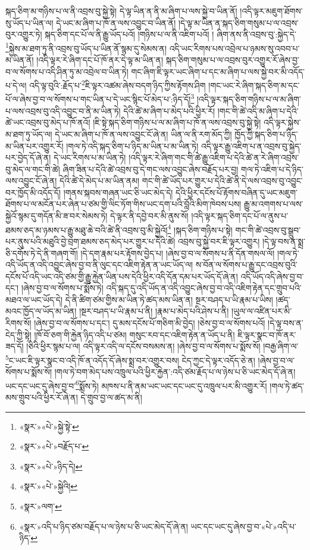 སྐད་ཅིག་མ་གཉིས་པ་ལ་ནི་འབྲས་བུ་སྐྱེ་སྟེ། དེ་ལྟ་ཡིན་ན་ནི་མ་ཞིག་པ་ལས་སྐྱེ་བ་ཡིན་ནོ། །འདི་ལྟར་མཇུག་ཐོགས་སུ་ཡོད་པ་ཡིན་ལ། དེ་ཡང་མ་ཞིག་པ་ཁོ་ན་ལས་འབྱུང་བ་ཡིན་ནོ། །དེ་ལྟ་མ་ཡིན་ན་སྐད་ཅིག་གསུམ་པ་ལ་འབྲས་བུར་འགྱུར་ཏེ། སྐད་ཅིག་དང་པོ་ལ་ནི་རྒྱུ་ཡོད་པའོ། །གཉིས་པ་ལ་ནི་འཇིག་པའོ། །
ཞིག་ནས་ནི་འབྲས་བུ་:སྐྱེད་དེ་\footnote{«སྣར་»«པེ་»སྐྱེ་སྟེ་}སྐྱེས་མ་ཐག་ཏུ་ནི་འབྲས་བུ་ཡོད་པ་ཡིན་ནོ་སྙམ་དུ་སེམས་ན། འདི་ཡང་རིགས་པས་འབྲེལ་པ་ཉམས་སུ་འབབ་པ་མ་ཡིན་ནོ། །འདི་ལྟར་རེ་ཞིག་དང་པོ་ཁོ་ནར་དེ་ལྟ་མ་ཡིན་ན། སྐད་ཅིག་གསུམ་པ་ལ་འབྲས་བུར་འགྱུར་རོ་ཞེས་བྱ་བ་ལ་སོགས་པ་འདི་ཤིན་ཏུ་མ་འབྲེལ་བ་ཡིན་ཏེ། གང་ཞིག་ཇི་ལྟར་ཡང་ཞིག་པ་དང་མ་ཞིག་པ་ལས་སྐྱེ་བར་མི་འདོད་པ་དེ་ལ། འདི་ལྟ་བུའི་:རྗོད་པ་\footnote{«སྣར་»«པེ་»བརྗོད་པ་}ཇི་ལྟར་འཚམ་ཞེས་བདག་ཉིད་ཀྱིས་རྟོགས་ཤིག །གང་ཡང་རེ་ཞིག་སྐད་ཅིག་མ་དང་པོ་ལ་ཞེས་བྱ་བ་ལ་སོགས་པ་གང་ཡིན་པ་དེ་ཡང་སྙིང་པོ་མེད་པ་:ཉིད་དོ།\footnote{«སྣར་»«པེ་»ཉིད་དེ།} །འདི་ལྟར་སྐད་ཅིག་གཉིས་པ་ལ་མ་ཞིག་པ་ལས་འབྲས་བུ་འདི་འབྱུང་བ་ནི་མ་ཡིན་ཏེ། དེའི་ཚེ་མ་ཞིག་པ་མེད་པའི་ཕྱིར་རོ། །གང་གི་ཚེ་འདི་མ་ཞིག་པ་དེའི་ཚེ་ཡང་འབྲས་བུ་མེད་པ་ཁོ་ནའོ། །ཇི་སྟེ་སྐད་ཅིག་གཉིས་པ་ལ་མ་ཞིག་པ་ཁོ་ན་ལས་འབྲས་བུ་སྐྱེ་སྟེ། འདི་ལྟར་སྐྱེས་མ་ཐག་ཏུ་ཡོད་ལ། དེ་ཡང་མ་ཞིག་པ་ཁོ་ན་ལས་འབྱུང་ངོ་ཞེ་ན། ཡིན་ལ་ནི་རག་མོད་ཀྱི། ཁྱོད་ཀྱི་སྐད་ཅིག་པ་ཉིད་མ་ཡིན་པར་འགྱུར་རོ། །གལ་ཏེ་འདི་སྐད་ཅིག་པ་ཉིད་མ་ཡིན་པ་མ་ཡིན་ཏེ། འདི་ལྟར་རྒྱུ་འཇིག་པ་ན་འབྲས་བུ་སྐྱེད་པར་བྱེད་དོ་ཞེ་ན། དེ་ཡང་རིགས་པ་མ་ཡིན་ཏེ། །འདི་ལྟར་རེ་ཞིག་གང་གི་ཚེ་རྒྱུ་འཇིག་པ་དེའི་ཚེ་ན་རེ་ཞིག་འབྲས་བུ་མེད་ལ་གང་གི་ཚེ། ཞིག་ཟིན་པ་དེའི་ཚེ་འབྲས་བུ་དེ་གང་ལས་འབྱུང་ཞེས་བརྗོད་པར་བྱ། གལ་ཏེ་འཇིག་པ་དེ་ཉིད་ལས་འབྱུང་ངོ་ཞེ་ན། དེའི་ཚེ་དེ་མེད་པ་མ་ཡིན་ནམ། གང་གི་ཚེ་ཡོད་པར་གྱུར་པ་དེའི་ཚེ་ནི་དེ་ལས་འབྲས་བུ་འབྱུང་བར་ཁྱོད་མི་འདོད་དོ། །གནས་སྐབས་གཞན་ཡང་ཅི་ཡང་མེད་དེ། དེའི་ཕྱིར་དངོས་པོ་རྟོགས་བཞིན་དུ་ཡང་མཇུག་ཐོགས་པ་ལ་མངོན་པར་ཞེན་པ་ཙམ་གྱི་ལིང་ཏོག་གིས་ཡང་དག་པའི་བློའི་མིག་ཁེབས་པས། རྒྱུ་མ་འགགས་པ་ལས་སྐྱེའོ་སྙམ་དུ་གདོན་མི་ཟ་བར་སེམས་ཏེ། དེ་ལྟར་ནི་དབྱེ་བར་མི་ནུས་སོ། །འདི་ལྟར་སྐད་ཅིག་དང་པོ་ལ་ནུས་པ་ཐམས་ཅད་མ་ཉམས་པ་རྒྱུ་མཐུ་ཆེ་བའི་ཚེ་ནི་འབྲས་བུ་མི་སྐྱེའོ།\footnote{«སྣར་»«པེ་»སྐྱེའི།} །སྐད་ཅིག་གཉིས་པ་སྟེ། གང་གི་ཚེ་འབྲས་བུ་སྒྲུབ་པར་ནུས་པའི་མཐུའི་བྱེ་བྲག་ཐམས་ཅད་མེད་པར་གྱུར་པ་དེའི་ཚེ། འབྲས་བུ་སྐྱེ་བར་ཇི་ལྟར་འགྱུར། །དེ་ལྟ་བས་ན་སྨྲ་ཅི་དགོས་ཏེ་དེ་ནི་གཞག་གོ། །དེ་དག་རྣམ་པར་རྟོགས་བྱེད་པ། །ཞེས་བྱ་བ་ལ་སོགས་པ་ནི་དོན་གསལ་ལོ། །གལ་ཏེ་འདི་ཡོད་ན་འདི་འབྱུང་ཞེས་བྱ་བ་ནི་ལུང་དང་འཇིག་རྟེན་ན་ཡང་ཡོད་ལ། ས་བོན་ལ་སོགས་པ་རྒྱུ་དང་འབྲས་བུའི་དངོས་པོ་འདི་ཡང་འདི་ཙམ་གྱི་རྒྱུ་རྐྱེན་ཡིན་པས་དེའི་ཕྱིར་འདི་དོན་དམ་པར་ཡོད་དོ་ཞེ་ན། འདི་ཡོད་འདི་ཞེས་བྱ་བ་དང་། །ཞེས་བྱ་བ་ལ་སོགས་པ་སྨོས་ཏེ། འདི་སྐད་དུ་འདི་ཡོད་ན་འདི་འབྱུང་ཞེས་བྱ་བ་འདི་འཇིག་རྟེན་དང་གྲུབ་པའི་མཐའ་ལ་ཡང་ཡོད་དེ། དེ་ནི་ཚིག་ཙམ་གྱིས་མ་ཡིན་ཏེ་ཚད་མས་ཡིན་ན། སྔར་བཤད་པ་ཡི་རྣམ་པ་ཡིས། །ཚད་མའང་ཁྱོད་ལ་ཡོད་མ་ཡིན། །སྔར་བཤད་པ་ཡི་རྣམ་པ་ནི། །རྣམ་པ་མེད་པའི་ཤེས་པ་ནི། །ཡུལ་ལ་འཛིན་པར་མི་རིགས་སོ། །ཞེས་བྱ་བ་ལ་སོགས་པ་དང་། དུ་མས་དངོས་པོ་གཅིག་མི་བྱེད། །ཅེས་བྱ་བ་ལ་སོགས་པའོ། །དེ་ལྟ་བས་ན་ངེད་ཀྱི་སྟེ། །ཁོ་བོ་ཅག་གི་རྐྱེན་ཉིད་འདི་པ་ཙམ། གསུང་རབ་དང་འཇིག་རྟེན་ན་ཡོད་པ་ནི། ཇི་ལྟར་སྣང་བ་ཁོ་ནར་ཟད་དོ། །ཅིའི་ཕྱིར་སྙམ་པ་ལ། འདི་ལྟར་འདི་ལ་དངོས་བསམས་ན། །ཞེས་བྱ་བ་ལ་སོགས་པ་སྨོས་སོ། །བརྒྱ་ཞིག་ལ་\footnote{«སྣར་»ལག་}ང་ཡང་ཇི་ལྟར་སྣང་བ་འདི་ཁོ་ན་འདོད་དོ་ཞེས་སྨྲ་བར་འགྱུར་བས། ངེད་ཀྱང་དེ་ལྟར་འདོད་ཅེ་ན། །ཞེས་བྱ་བ་ལ་སོགས་པ་སྨོས་སོ། །གལ་ཏེ་བག་མེད་པས་འཁྲུལ་པའི་ཕྱིར་རྐྱེན་:འདི་ཙམ་རྗོད་པ་ལ་ཉེས་པ་ཅི་ཡང་མེད་དོ་ཞེ་ན། ཡང་དང་ཡང་དུ་ཞེས་བྱ་བ་\footnote{«སྣར་»འདི་པ་ཉིད་ཙམ་བརྗོད་པ་ལ་ཉེས་པ་ཅི་ཡང་མེད་དོ་ཞེ་ན། ཡང་དང་ཡང་དུ་ཞེས་བྱ་བ་«པེ་»འདི་པ་ཉིད་}སྨོས་ཏེ། མཁས་པ་ནི་ནམ་ཡང་ཡང་དང་ཡང་དུ་འཁྲུལ་པར་མི་འགྱུར་རོ། །གལ་ཏེ་ཚད་མས་གྲུབ་པའི་ཕྱིར་རོ་ཞེ་ན། དེ་གྲུབ་བྱ་ལ་ཚད་མ་ནི། 